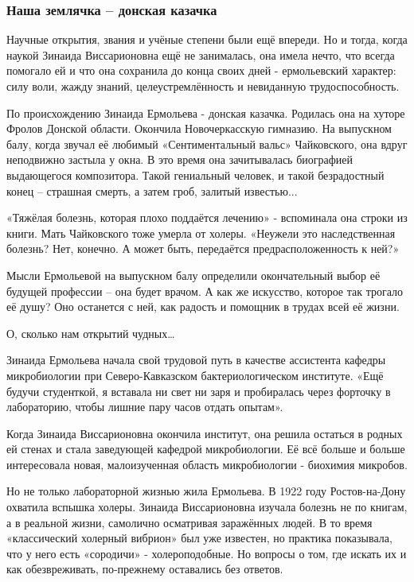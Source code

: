 \subsubsection{Наша землячка – донская казачка}

Научные открытия, звания и учёные степени были ещё впереди. Но и тогда, когда
наукой Зинаида Виссарионовна ещё не занималась, она имела нечто, что всегда
помогало ей и что она сохранила до конца своих дней - ермольевский характер:
силу воли, жажду знаний, целеустремлённость и невиданную трудоспособность.

По происхождению Зинаида Ермольева - донская казачка. Родилась она на хуторе
Фролов Донской области. Окончила Новочеркасскую гимназию. На выпускном балу,
когда звучал её любимый «Сентиментальный вальс» Чайковского, она вдруг
неподвижно застыла у окна. В это время она зачитывалась биографией выдающегося
композитора. Такой гениальный человек, и такой безрадостный конец – страшная
смерть, а затем гроб, залитый известью...

«Тяжёлая болезнь, которая плохо поддаётся лечению» - вспоминала она строки из
книги. Мать Чайковского тоже умерла от холеры. «Неужели это наследственная
болезнь? Нет, конечно. А может быть, передаётся предрасположенность к ней?»

Мысли Ермольевой на выпускном балу определили окончательный выбор её будущей
профессии – она будет врачом. А как же искусство, которое так трогало её душу?
Оно останется с ней, как радость и помощник в трудах всей её жизни.

О, сколько нам открытий чудных…

Зинаида Ермольева начала свой трудовой путь в качестве ассистента кафедры
микробиологии при Северо-Кавказском бактериологическом институте. «Ещё будучи
студенткой, я вставала ни свет ни заря и пробиралась через форточку в
лабораторию, чтобы лишние пару часов отдать опытам».

Когда Зинаида Виссарионовна окончила институт, она решила остаться в родных ей
стенах и стала заведующей кафедрой микробиологии. Её всё больше и больше
интересовала новая, малоизученная область микробиологии - биохимия микробов.

Но не только лабораторной жизнью жила Ермольева. В 1922 году Ростов-на-Дону
охватила вспышка холеры. Зинаида Виссарионовна изучала болезнь не по книгам, а
в реальной жизни, самолично осматривая заражённых людей. В то время
«классический холерный вибрион» был уже известен, но практика показывала, что у
него есть «сородичи» - холероподобные. Но вопросы о том, где искать их и как
обезвреживать, по-прежнему оставались без ответов.

